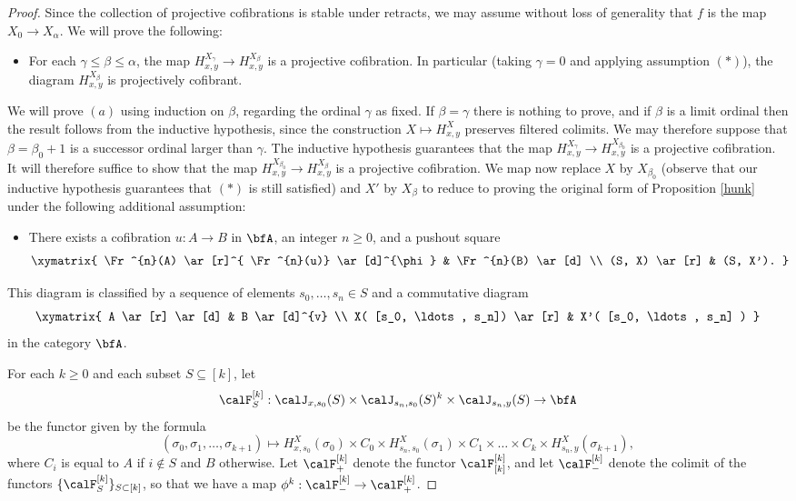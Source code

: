 \begin{proof}
Since the collection of projective cofibrations is stable under retracts, we may assume without loss of generality that $f$ is the map $X_0 \rightarrow X_{\alpha}$. We will prove the following:
\begin{itemize}
\item[$(a)$] For each $\gamma \leq \beta \leq \alpha$, the map $H^{X_{\gamma}}_{x,y} \rightarrow
H^{X_{\beta}}_{x,y}$ is a projective cofibration. In particular (taking $\gamma = 0$ and applying assumption $(\ast)$), the diagram $H^{X_{\beta}}_{x,y}$ is projectively cofibrant.
\end{itemize}
We will prove $(a)$ using induction on $\beta$, regarding the ordinal $\gamma$ as fixed.
If $\beta = \gamma$ there is nothing to prove, and if $\beta$ is a limit ordinal then the result follows from the inductive hypothesis, since the construction $X \mapsto H^{X}_{x,y}$ preserves filtered colimits.
We may therefore suppose that $\beta = \beta_0 + 1$ is a successor ordinal larger than $\gamma$. The inductive hypothesis guarantees that the map $H^{X_{\gamma}}_{x,y} \rightarrow H^{X_{\beta_0}}_{x,y}$ is a projective cofibration. It will therefore suffice to show that the map
$H^{X_{\beta_0}}_{x,y} \rightarrow H^{X_{\beta}}_{x,y}$ is a projective cofibration. 
We map now replace $X$ by $X_{\beta_0}$ (observe that
our inductive hypothesis guarantees that $(\ast)$ is still satisfied) and $X'$ by $X_{\beta}$ to
reduce to proving the original form of Proposition \ref{hunk} under the following additional assumption:

\begin{itemize}
\item[$(\ast')$] There exists a cofibration $u: A \rightarrow B$ in $\bfA$, an integer $n \geq 0$, and a pushout square
$$ \xymatrix{ \Fr^{n}(A) \ar[r]^{ \Fr^{n}(u)} \ar[d]^{\phi} & \Fr^{n}(B) \ar[d] \\
(S, X) \ar[r] & (S, X'). }$$
\end{itemize}
This diagram is classified by a sequence of elements $s_0, \ldots, s_n \in S$ and a commutative
diagram
$$ \xymatrix{ A \ar[r] \ar[d] & B \ar[d]^{v} \\
X( [s_0, \ldots, s_n]) \ar[r] & X'( [s_0, \ldots, s_n] ) }$$
in the category $\bfA$.

For each $k \geq 0$ and each subset $S \subseteq [k]$, let
$$\calF^{[k]}_{S}: \calJ_{x, s_0}(S) \times \calJ_{s_n, s_0}(S)^{k} \times \calJ_{s_n, y}(S)
\rightarrow \bfA$$
be the functor given by the formula
$$( \sigma_0, \sigma_1, \ldots, \sigma_{k+1}) \mapsto
H^{X}_{x,s_0}( \sigma_0) \times C_0 \times
H^{X}_{s_n,s_0}(\sigma_1) \times C_1 \times \ldots \times C_k \times H^{X}_{s_n, y}(\sigma_{k+1}),$$
where $C_i$ is equal to $A$ if $i \notin S$ and $B$ otherwise. Let $\calF^{[k]}_{+}$ denote the functor
$\calF^{[k]}_{[k]}$, and let $\calF^{[k]}_{-}$ denote the colimit of the functors
$\{ \calF^{[k]}_{S} \}_{S \subset [k] }$, so that we have a map $\phi^{k}: \calF^{[k]}_{-} \rightarrow
\calF^{[k]}_{+}$.


\end{proof}
